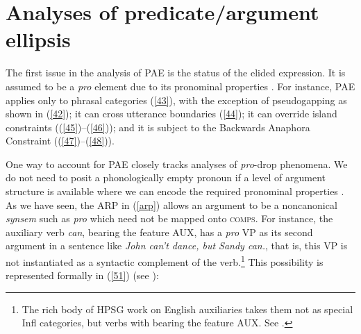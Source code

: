 {\section{Analyses of predicate/argument ellipsis}
\label{sec-analyses-of-pred-ellipsis}
The first issue in the analysis of PAE is the status of the elided expression. It is assumed to be a \textit{pro} element due to its pronominal properties \citep[see][]{Lobeck1995, Lopez2000, Kim2006, Aelbrecht2015, Ginzburg2018}. For instance, PAE applies only to phrasal categories (\ref{43}), with the exception of pseudogapping as shown in (\ref{42}); it can cross utterance boundaries (\ref{44}); it can override island constraints ((\ref{45})--(\ref{46})); and it is subject to the Backwards Anaphora Constraint ((\ref{47})--(\ref{48})).

\z
{}
\z
{}
\z
{}
\z
{}
\z
{}
\z
{}
\z

One way to account for PAE closely tracks analyses of \emph{pro}-drop phenomena. We do not need to posit a phonologically empty pronoun if a level of argument structure is
available where we can encode the required pronominal properties \citep[see][]{Bresnan1982a,Ginzburg:Sag:2000}. As we have seen, the ARP in (\ref{arp})
allows an 
argument to be a noncanonical  \emph{synsem}
such as \textit{pro} which need not be mapped onto \textsc{comps}. 
%
For instance, the auxiliary
verb \textit{can}, bearing the feature AUX, has a \textit{pro} VP as its second argument in a sentence like \textit{John can't dance, but Sandy can.}, that is, this VP is not instantiated as a syntactic complement of the verb.\footnote{The rich body of HPSG work on English auxiliaries takes them not as special Infl categories, but verbs with bearing the feature AUX. See \citet{Kim:00, KS2002a, Sag:Wasow:Bender:2003, Sag2020a, kimmichaelis:2020}.} This possibility is represented formally in (\ref{51}) 
(see \citealt{Kim2006, ginzburg-miller-ellipsis-handbook}):

}
